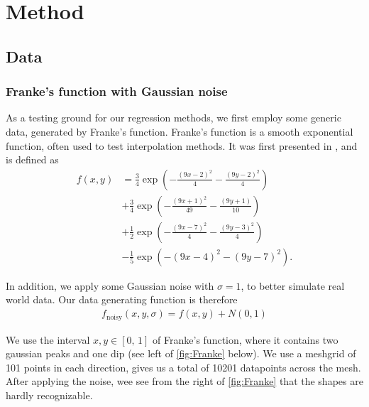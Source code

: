 \documentclass[10pt, twocolumn]{article}
\begin{document}
\section{Method}

\subsection{Data}
\subsubsection{Franke's function with Gaussian noise}
As a testing ground for our regression methods, we first employ some generic data, generated by Franke's function. Franke's function is a smooth exponential function, often used to test interpolation methods. It was first presented in \citep{Franke}, and is defined as
\begin{equation}
\begin{aligned}
    f(x, y) &=\frac{3}{4} \exp \left(-\frac{(9 x-2)^{2}}{4}-\frac{(9 y-2)^{2}}{4}\right) \\
    &+ \frac{3}{4} \exp \left(-\frac{(9 x+1)^{2}}{49}-\frac{(9 y+1)}{10}\right) \\
    &+\frac{1}{2} \exp \left(-\frac{(9 x-7)^{2}}{4}-\frac{(9 y-3)^{2}}{4}\right) \\
    &- \frac{1}{5} \exp \left(-(9 x-4)^{2}-(9 y-7)^{2}\right).
\end{aligned}
\end{equation}

In addition, we apply some Gaussian noise with $\sigma = 1$, to better simulate real world data. Our data generating function is therefore
\begin{align}\label{eq:franke_w_noise}
    f_{\mathrm{noisy}}(x, y, \sigma) = f(x, y) + N(0, 1)
\end{align}

We use the interval $x,y \in [0,\, 1]$ of Franke's function, where it contains two gaussian peaks and one dip (see left of \cref{fig:Franke} below). We use a meshgrid of 101 points in each direction, gives us a total of 10201 datapoints across the mesh. After applying the noise, wee see from the right of \cref{fig:Franke} that the shapes are hardly recognizable.
\end{document}
